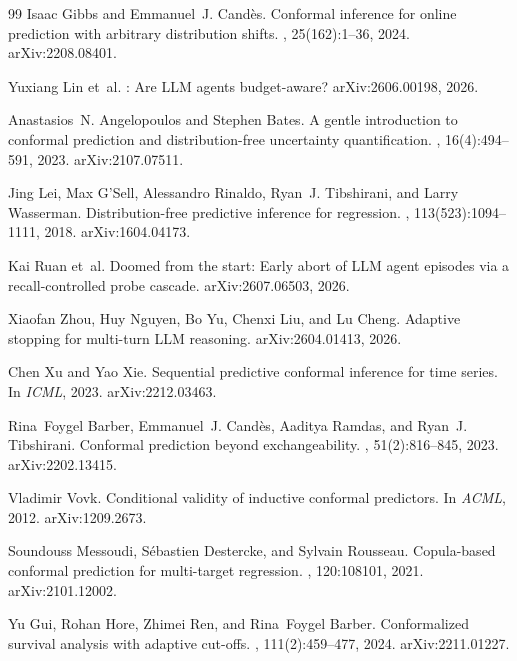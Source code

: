 \documentclass{article}
\begin{document}
{\begin{thebibliography}{99}
Isaac Gibbs and Emmanuel~J. Cand{\`e}s.
\newblock Conformal inference for online prediction with arbitrary distribution shifts.
, 25(162):1--36, 2024.
\newblock arXiv:2208.08401.

Yuxiang Lin et~al.
: Are {LLM} agents budget-aware?
\newblock arXiv:2606.00198, 2026.

Anastasios~N. Angelopoulos and Stephen Bates.
\newblock A gentle introduction to conformal prediction and distribution-free uncertainty quantification.
, 16(4):494--591, 2023.
\newblock arXiv:2107.07511.

Jing Lei, Max G'Sell, Alessandro Rinaldo, Ryan~J. Tibshirani, and Larry Wasserman.
\newblock Distribution-free predictive inference for regression.
, 113(523):1094--1111, 2018.
\newblock arXiv:1604.04173.

Kai Ruan et~al.
\newblock Doomed from the start: Early abort of {LLM} agent episodes via a recall-controlled probe cascade.
\newblock arXiv:2607.06503, 2026.

Xiaofan Zhou, Huy Nguyen, Bo Yu, Chenxi Liu, and Lu Cheng.
\newblock Adaptive stopping for multi-turn {LLM} reasoning.
\newblock arXiv:2604.01413, 2026.

Chen Xu and Yao Xie.
\newblock Sequential predictive conformal inference for time series.
\newblock In {\em ICML}, 2023.
\newblock arXiv:2212.03463.

Rina~Foygel Barber, Emmanuel~J. Cand{\`e}s, Aaditya Ramdas, and Ryan~J. Tibshirani.
\newblock Conformal prediction beyond exchangeability.
, 51(2):816--845, 2023.
\newblock arXiv:2202.13415.

Vladimir Vovk.
\newblock Conditional validity of inductive conformal predictors.
\newblock In {\em ACML}, 2012.
\newblock arXiv:1209.2673.

Soundouss Messoudi, S{\'e}bastien Destercke, and Sylvain Rousseau.
\newblock Copula-based conformal prediction for multi-target regression.
, 120:108101, 2021.
\newblock arXiv:2101.12002.

Yu Gui, Rohan Hore, Zhimei Ren, and Rina~Foygel Barber.
\newblock Conformalized survival analysis with adaptive cut-offs.
, 111(2):459--477, 2024.
\newblock arXiv:2211.01227.


\end{thebibliography}}
\end{document}
